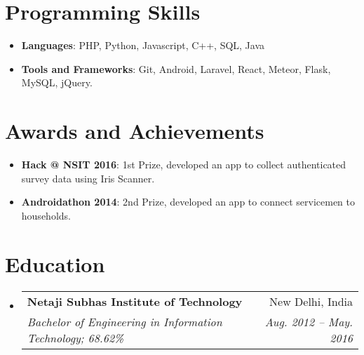 \documentclass[letterpaper,11pt]{article}
\makeatletter
\newcommand{\resumeItem}[2]{
  \item\small{
    \textbf{#1}{: #2 \vspace{-2pt}}
  }
}
\newcommand{\resumeSubheading}[4]{
  \vspace{-1pt}\item
    \begin{tabular*}{0.97\textwidth}{l@{\extracolsep{\fill}}r}
      \textbf{#1} & #2 \\
      \textit{\small#3} & \textit{\small #4} \\
    \end{tabular*}\vspace{-5pt}
}
\newcommand{\resumeSubItem}[2]{\resumeItem{#1}{#2}\vspace{-4pt}}
\newcommand{\resumeSubHeadingListStart}{\begin{itemize}[leftmargin=*]}
\newcommand{\resumeSubHeadingListEnd}{\end{itemize}}
\makeatother
\begin{document}
  
\section{Programming Skills}
 \resumeSubHeadingListStart
    \resumeSubItem{Languages}
       {PHP, Python, Javascript, C++, SQL, Java}
    \resumeSubItem{Tools and Frameworks}
       {Git, Android, Laravel, React, Meteor, Flask, MySQL, jQuery.}
 \resumeSubHeadingListEnd

\section{Awards and Achievements}
  \resumeSubHeadingListStart
    \resumeSubItem{Hack @ NSIT 2016}
       {1st Prize, developed an app to collect authenticated survey data using Iris Scanner.}
    \resumeSubItem{Androidathon 2014}
       {2nd Prize, developed an app to connect servicemen to households.}
  \resumeSubHeadingListEnd


\section{Education}
  \resumeSubHeadingListStart
    \resumeSubheading
      {Netaji Subhas Institute of Technology}{New Delhi, India}
      {Bachelor of Engineering in Information Technology;  68.62\%}{Aug. 2012 -- May. 2016}
  \resumeSubHeadingListEnd
\end{document}
